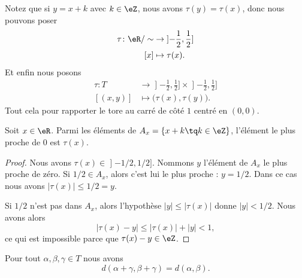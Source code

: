 Notez que si \( y=x+k\) avec \( k\in \eZ\), nous avons \( \tau(y)=\tau(x)\), donc nous pouvons poser
\begin{equation}
	\begin{aligned}
		\tau\colon \eR/\sim & \to \mathopen] -\frac{ 1 }{2},\frac{ 1 }{2}\mathclose] \\
		[x]                 & \mapsto \tau(x).
	\end{aligned}
\end{equation}
Et enfin nous posons
\begin{equation}		\label{EQooCRZHooMNPBDo}
	\begin{aligned}
		\tau\colon T & \to \mathopen] -\frac{ 1 }{2},\frac{ 1 }{2}\mathclose]\times \mathopen] -\frac{ 1 }{2},\frac{ 1 }{2}\mathclose] \\
		[(x,y)]      & \mapsto \big( \tau(x),\tau(y) \big).
	\end{aligned}
\end{equation}
Tout cela pour rapporter le tore au carré de côté \( 1\) centré en \( (0,0)\).

\begin{proposition}	\label{PROPooNRNGooJahxQv}
	Soit \( x\in \eR\). Parmi les éléments de \( A_x=\{ x+k\tq k\in \eZ \}\), l'élément le plus proche de \( 0\) est \( \tau(x)\).
\end{proposition}

\begin{proof}
	Nous avons \( \tau(x)\in\mathopen] -1/2,1/2\mathclose]\). Nommons \( y\) l'élément de \( A_x\) le plus proche de zéro. Si \( 1/2\in A_x\), alors c'est lui le plus proche : \( y=1/2\). Dans ce cas nous avons \( | \tau(x) |\leq 1/2=y\).

	Si \( 1/2\) n'est pas dans \( A_x\), alors l'hypothèse \( | y |\leq | \tau(x) |\) donne \( | y |<1/2\). Nous avons alors
	\begin{equation}
		| \tau(x)-y |\leq | \tau(x) |+| y |<1,
	\end{equation}
	ce qui est impossible parce que \( \tau(x)-y\in \eZ\).
\end{proof}

\begin{lemma}	\label{LEMooQAQPooGGumSe}
	Pour tout \( \alpha,\beta, \gamma\in T\) nous avons
	\begin{equation}
		d(\alpha+\gamma,\beta+\gamma)=d(\alpha,\beta).
	\end{equation}
\end{lemma}

